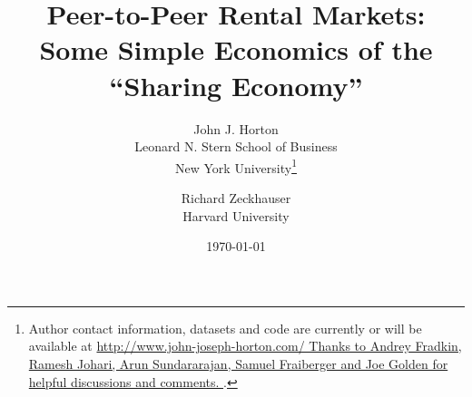 \documentclass[11pt]{article}
\newcommand{\important}[1]{\textcolor{orange}{\textbf{#1}}}
\newcommand{\important}[1]{#1}
\begin{document}
 

\title{Peer-to-Peer Rental Markets: \\ Some Simple Economics of the ``Sharing Economy''} 

\date{\today}

\author{John J. Horton \\ Leonard N. Stern School of Business \\ New
  York University\footnote{Author contact information, datasets and
    code are currently or will be available at
    \href{http://www.john-joseph-horton.com/}{http://www.john-joseph-horton.com/
    Thanks to Andrey Fradkin, Ramesh Johari, Arun Sundararajan, Samuel Fraiberger and Joe Golden for helpful discussions and comments.
}.}
  \and 
  Richard Zeckhauser \\ Harvard University
}
\maketitle


\end{document}
